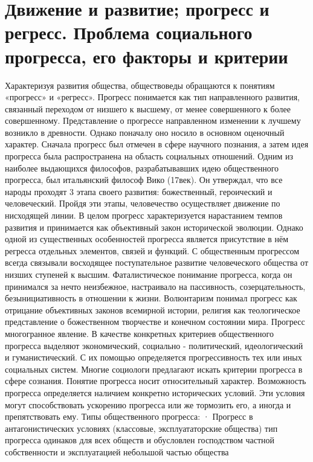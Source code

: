 \documentclass[12pt]{article}
\begin{document}
\newpage
\section{Движение и развитие; прогресс и регресс. Проблема социального прогресса, его факторы и критерии}
Характеризуя  развития общества, обществоведы обращаются к понятиям «прогресс» и «регресс». Прогресс
понимается  как  тип  направленного  развития,  связанный  переходом  от  низшего  к  высшему,   от  менее
совершенного  к  более  совершенному.  Представление  о  прогрессе   направленном   изменении  к  лучшему
возникло в древности. Однако поначалу оно носило в основном оценочный характер. Сначала прогресс был
отмечен в сфере научного познания, а затем идея  прогресса была распространена на область социальных
отношений. Одним из наиболее выдающихся  философов, разрабатывавших идею общественного прогресса,
был итальянский философ  Вико (17век). Он утверждал, что все народы проходят 3 этапа своего развития:
божественный,  героический и человеческий. Пройдя эти этапы, человечество осуществляет движение  по
нисходящей  линии.  В  целом  прогресс  характеризуется  нарастанием  темпов  развития   и  принимается  как
объективный закон исторической эволюции. Однако одной из существенных особенностей прогресса является
присутствие в нём регресса отдельных элементов, связей  и функций. С общественным прогрессом всегда
связывали  восходящее  поступательное  развитие   человеческого  общества  от  низших  ступеней  к  высшим.
Фаталистическое  понимание  прогресса,   когда  он  принимался  за  нечто  неизбежное,  настраивало  на
пассивность, созерцательность, безынициативность в отношении к жизни. Волюнтаризм понимал прогресс как
отрицание   объективных  законов  всемирной  истории,  религия   как  теологическое  представление  о
божественном  творчестве  и  конечном  состоянии  мира.  Прогресс   многогранное  явление.   В  качестве
конкретных  критериев  общественного  прогресса  выделяют  экономический,  социально   -  политический,
идеологический и гуманистический. С их помощью определяется прогрессивность тех или иных социальных  
систем. Многие социологи предлагают искать критерии прогресса в сфере сознания. Понятие прогресса носит
относительный характер. Возможность прогресса  определяется наличием конкретно  исторических условий.
Эти условия могут способствовать ускорению прогресса или же тормозить его, а иногда и препятствовать ему.
Типы общественного прогресса:
· Прогресс в антагонистических условиях (классовые, эксплуататорские общества) тип прогресса одинаков для
всех обществ и обусловлен господством частной собственности и эксплуатацией небольшой частью общества
\end{document}
